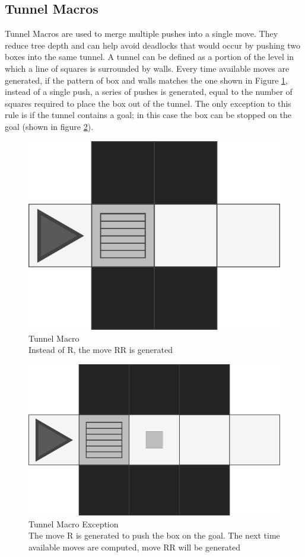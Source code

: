 \subsection{Tunnel Macros}
Tunnel Macros are used to merge multiple pushes into a single move. They reduce tree depth and can help avoid deadlocks that would occur by pushing two boxes into the same tunnel.
A tunnel can be defined as a portion of the level in which a line of squares is surrounded by walls. Every time available moves are generated, if the pattern of box and walls matches the one shown in Figure \ref{fig:tunnelmacro}, instead of a single push, a series of pushes is generated, equal to the number of squares required to place the box out of the tunnel. The only exception to this rule is if the tunnel contains a goal; in this case the box can be stopped on the goal (shown in figure \ref{fig:tunnelmacroexception}).
\begin{figure}[ht]
    \centering
    \includegraphics[width=0.4\linewidth]{pictures/TunnelMacro.png}
    \caption[Tunnel Macro]{Tunnel Macro\\ Instead of R, the move RR is generated}
    \label{fig:tunnelmacro}
\end{figure}
\begin{figure}[ht]
    \centering
    \includegraphics[width=0.5\linewidth]{pictures/TunnelMacroException.png}
    \caption[Tunnel Macro Exception]{Tunnel Macro Exception\\ The move R is generated to push the box on the goal. The next time available moves are computed, move RR will be generated}
    \label{fig:tunnelmacroexception}
\end{figure}

